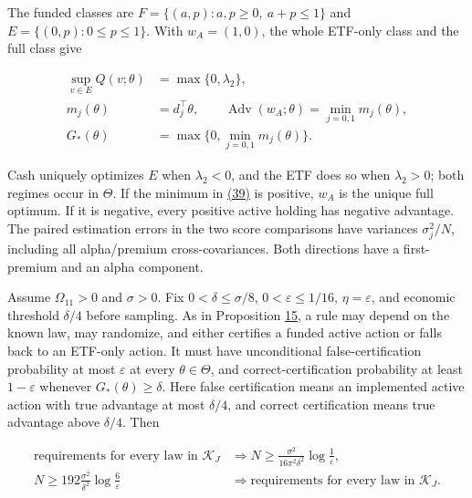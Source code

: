 \documentclass[11pt]{article}
\begin{document}
The funded classes are
\(F=\{(a,p):a,p\geq0,\ a+p\leq1\}\) and
\(E=\{(0,p):0\leq p\leq1\}\). With \(w_A=(1,0)\),
the whole ETF-only class and the full class give

\begin{equation*}
\begin{aligned}
\sup_{v\in E}Q(v;\theta)&=\max\{0,\lambda_2\},\\
m_j(\theta)&=d_j^\top\theta,\qquad
\operatorname{Adv}(w_A;\theta)=\min_{j=0,1}m_j(\theta),\\
G_*(\theta)&=\max\{0,\min_{j=0,1}m_j(\theta)\}.
\end{aligned}\tag{39}\label{eq:39}
\end{equation*}

Cash uniquely optimizes \(E\) when \(\lambda_2<0\), and
the ETF does so when \(\lambda_2>0\); both regimes occur in
\(\Theta\). If the minimum in \hyperref[eq:39]{(39)} is positive,
\(w_A\) is the unique full optimum. If it is negative,
every positive active holding has negative advantage. The
paired estimation errors in the two score comparisons have
variances \(\sigma_j^2/N\), including all alpha/premium
cross-covariances. Both directions have a first-premium and
an alpha component.

Assume \(\Omega_{11}>0\) and \(\sigma>0\). Fix
\(0<\delta\leq\sigma/8\),
\(0<\varepsilon\leq1/16\),
\(\eta=\varepsilon\), and economic threshold
\(\delta/4\) before sampling. As in Proposition \hyperref[res:Proposition-15]{15}, a rule
may depend on the known law, may randomize, and either
certifies a funded active action or falls back to an ETF-only
action. It must have unconditional false-certification
probability at most \(\varepsilon\) at every
\(\theta\in\Theta\), and correct-certification probability
at least \(1-\varepsilon\) whenever \(G_*(\theta)\geq\delta\).
Here false certification means an implemented active action
with true advantage at most \(\delta/4\), and correct
certification means true advantage above \(\delta/4\).
Then

\begin{equation*}
\begin{aligned}
\text{requirements for every law in }\mathcal K_J
&\Longrightarrow
N\geq\frac{\sigma^2}{16\pi^2\delta^2}
          \log\frac1\varepsilon,\\
N\geq192\frac{\sigma^2}{\delta^2}
          \log\frac6\varepsilon
&\Longrightarrow
\text{requirements for every law in }\mathcal K_J.
\end{aligned}\tag{40}\label{eq:40}
\end{equation*}
\end{document}
